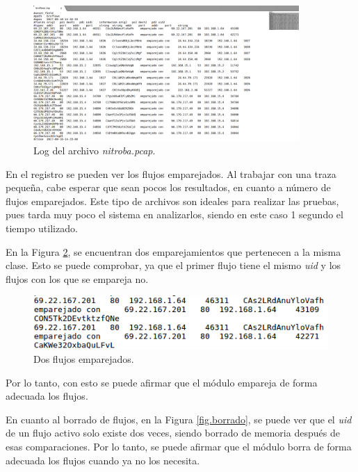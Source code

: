 \begin{figure}[H]
  \includegraphics[width=0.9\textwidth]{imagenes/lognitroba.png}
  \centering
  \caption{Log del archivo \textit{nitroba.pcap}.}\label{fig.lognitroba}
\end{figure}

\intro En el registro se pueden ver los flujos emparejados. Al trabajar con una traza pequeña, cabe esperar que sean pocos los 
resultados, en cuanto a número de flujos emparejados. Este tipo de archivos son ideales para realizar las pruebas, pues tarda muy poco 
el sistema en analizarlos, siendo en este caso 1 segundo el tiempo utilizado.

\intro En la Figura \ref{fig.dosflujosemparejados}, se encuentran dos emparejamientos que pertenecen a la misma clase. Esto se puede 
comprobar, ya que el primer flujo tiene el mismo \textit{uid} y los flujos con los que se empareja no.

\begin{figure}[H]
  \includegraphics[width=1\textwidth]{imagenes/dosflujosemparejados.png}
  \centering
  \caption{Dos flujos emparejados.}\label{fig.dosflujosemparejados}
\end{figure}

\intro Por lo tanto, con esto se puede afirmar que el módulo empareja de forma adecuada los flujos.

\intro En cuanto al borrado de flujos, en la Figura \ref{fig.borrado}, se puede ver que el \textit{uid} de un flujo activo solo existe 
dos veces, siendo borrado de memoria después de esas comparaciones. Por lo tanto, se puede afirmar que el módulo borra de forma 
adecuada los flujos cuando ya no los necesita.

